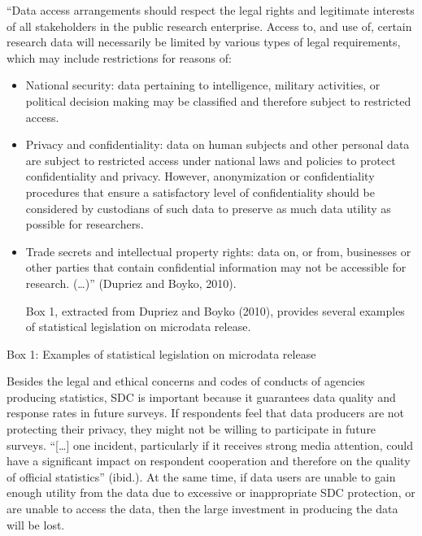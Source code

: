 \documentclass[letterpaper,10pt,english]{sphinxmanual}
\begin{document}
“Data access arrangements should respect the legal rights and legitimate
interests of all stakeholders in the public research enterprise. Access
to, and use of, certain research data will necessarily be limited by
various types of legal requirements, which may include restrictions for
reasons of:
\begin{itemize}
\item {} 
National security: data pertaining to intelligence, military
activities, or political decision making may be classified and
therefore subject to restricted access.

\item {} 
Privacy and confidentiality: data on human subjects and other
personal data are subject to restricted access under national laws
and policies to protect confidentiality and privacy. However,
anonymization or confidentiality procedures that ensure a
satisfactory level of confidentiality should be considered by
custodians of such data to preserve as much data utility as possible
for researchers.

\item {} 
Trade secrets and intellectual property rights: data on, or from,
businesses or other parties that contain confidential information may
not be accessible for research. (…)” (Dupriez and Boyko, 2010).

Box 1, extracted from Dupriez and Boyko (2010), provides several
examples of statistical legislation on microdata release.

\end{itemize}

Box 1: Examples of statistical legislation on microdata release

Besides the legal and ethical concerns and codes of conducts of agencies
producing statistics, SDC is important because it guarantees data
quality and response rates in future surveys. If respondents feel that
data producers are not protecting their privacy, they might not be
willing to participate in future surveys. “{[}…{]} one incident,
particularly if it receives strong media attention, could have a
significant impact on respondent cooperation and therefore on the
quality of official statistics” (ibid.). At the same time, if data users
are unable to gain enough utility from the data due to excessive or
inappropriate SDC protection, or are unable to access the data, then the
large investment in producing the data will be lost.
\end{document}
